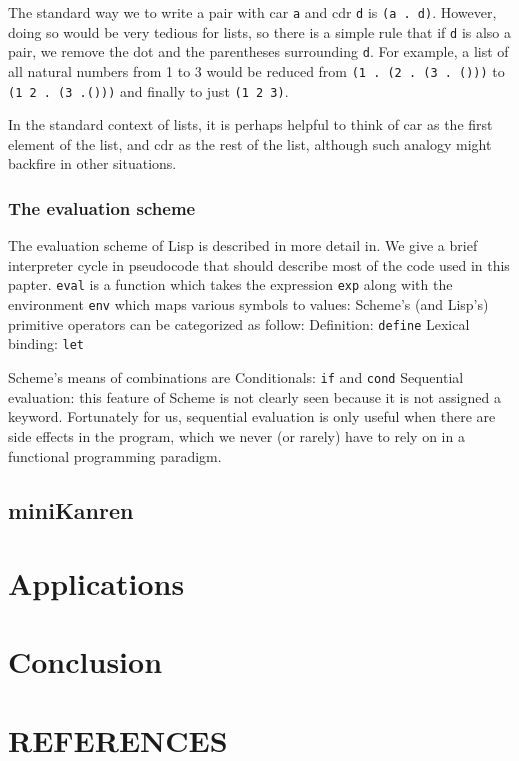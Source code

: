 \documentclass[12pt]{article}
\providecommand\phantomsection{}
\newcommand{\code}[1]{\texttt{#1}} %
\begin{document}
The standard way we to write a pair with car \code{a} and cdr \code{d} is \code{(a . d)}.
However, doing so would be very tedious for lists, so there is a simple rule that if \code{d} is also a pair, we remove the dot and the parentheses surrounding \code{d}.
For example, a list of all natural numbers from 1 to 3 would be reduced from \code{(1 . (2 . (3 . ()))} to \code{(1 2 . (3 .()))} and finally to just \code{(1 2 3)}.

In the standard context of lists, it is perhaps helpful to think of car as the first element of the list, and cdr as the rest of the list, although such analogy might backfire in other situations.

\subsubsection{The evaluation scheme}
The evaluation scheme of Lisp is described in more detail in.
We give a brief interpreter cycle in pseudocode that should describe most of the code used in this papter. \code{eval} is a function which takes the expression \code{exp} along with the environment \code{env} which maps various symbols to values:
Scheme's (and Lisp's) primitive operators can be categorized as follow: Definition: \code{define} Lexical binding: \code{let}

Scheme's means of combinations are
Conditionals: \code{if} and \code{cond}
Sequential evaluation: this feature of Scheme is not clearly seen because it is not assigned a keyword. Fortunately for us, sequential evaluation is only useful when there are side effects in the program, which we never (or rarely) have to rely on in a functional programming paradigm.

\subsection{miniKanren}

\section{Applications}

\section{Conclusion}


\newpage

\begingroup 
\linespread{1}

\setlength\bibitemsep{\baselineskip}

\setlength{\bibhang}{0pt}

\section*{REFERENCES}
\phantomsection
{}

\printbibliography[heading=none]
\endgroup
\end{document}
